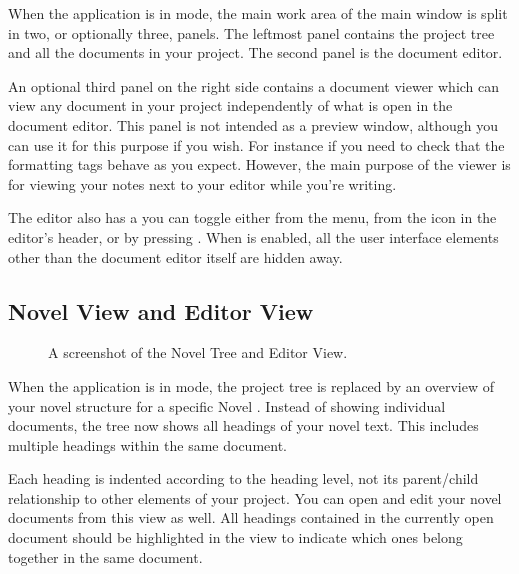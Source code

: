 \documentclass[a4paper,11pt,english]{sphinxmanual}
\begin{document}
\sphinxAtStartPar
When the application is in  mode, the main work area of the main window is
split in two, or optionally three, panels. The left\sphinxhyphen{}most panel contains the project tree and all
the documents in your project. The second panel is the document editor.

\sphinxAtStartPar
An optional third panel on the right side contains a document viewer which can view any document in
your project independently of what is open in the document editor. This panel is not intended as a
preview window, although you can use it for this purpose if you wish. For instance if you need to
check that the formatting tags behave as you expect. However, the main purpose of the viewer is for
viewing your notes next to your editor while you’re writing.

\sphinxAtStartPar
The editor also has a  you can toggle either from the menu, from the icon in the
editor’s header, or by pressing . When  is enabled, all the user interface
elements other than the document editor itself are hidden away.


\subsection{Novel View and Editor View}
\label{\detokenize{usage_breakdown:novel-view-and-editor-view}}
\begin{figure}[htbp]
\centering
\capstart

\noindent{}
\caption{A screenshot of the Novel Tree and Editor View.}\label{\detokenize{usage_breakdown:id2}}\end{figure}

\sphinxAtStartPar
When the application is in  mode, the project tree is replaced by an overview of
your novel structure for a specific Novel {\hyperref[\detokenize{int_glossary:term-Root-Folder}]{}}. Instead of showing individual
documents, the tree now shows all headings of your novel text. This includes multiple headings
within the same document.

\sphinxAtStartPar
Each heading is indented according to the heading level, not its parent/child relationship to other
elements of your project. You can open and edit your novel documents from this view as well. All
headings contained in the currently open document should be highlighted in the view to indicate
which ones belong together in the same document.
\end{document}
